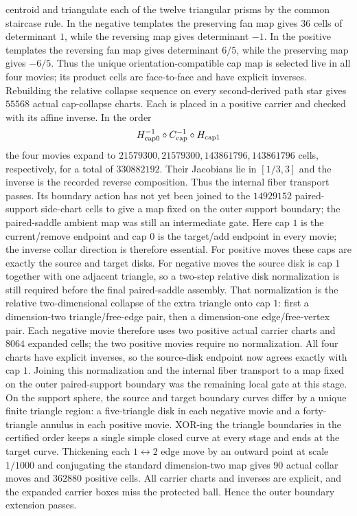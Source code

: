 centroid and triangulate each of the twelve triangular prisms by the common
staircase rule.  In the negative templates the preserving fan map gives $36$
cells of determinant $1$, while the reversing map gives determinant $-1$.  In
the positive templates the reversing fan map gives determinant $6/5$, while
the preserving map gives $-6/5$.  Thus the unique orientation-compatible cap
map is selected live in all four movies; its product cells are face-to-face and
have explicit inverses.  Rebuilding the relative collapse sequence on every
second-derived path star gives $55568$ actual cap-collapse charts.  Each is
placed in a positive carrier and checked with its affine inverse.  In the order
\begin{equation*}
H_{\rm cap0}^{-1}\circ C_{\rm cap}^{-1}\circ H_{\rm cap1}
\end{equation*}
the four movies expand to $21579300,21579300,143861796,143861796$ cells,
respectively, for a total of $330882192$.  Their Jacobians lie in $[1/3,3]$
and the inverse is the recorded reverse composition.  Thus the internal fiber
transport passes.  Its boundary action has not yet been joined to the
$14929152$ paired-support side-chart cells to give a map fixed on the outer
support boundary; the paired-saddle ambient map was still an intermediate gate.
Here cap $1$ is the current/remove endpoint and cap $0$ is the target/add
endpoint in every movie; the inverse collar direction is therefore essential.
For positive moves these caps are exactly the source and target disks.  For
negative moves the source disk is cap $1$ together with one adjacent triangle,
so a two-step relative disk normalization is still required before the final
paired-saddle assembly.
That normalization is the relative two-dimensional collapse of the extra
triangle onto cap $1$: first a dimension-two triangle/free-edge pair, then a
dimension-one edge/free-vertex pair.  Each negative movie therefore uses two
positive actual carrier charts and $8064$ expanded cells; the two positive
movies require no normalization.  All four charts have explicit inverses, so
the source-disk endpoint now agrees exactly with cap $1$.  Joining this
normalization and the internal fiber transport to a map fixed on the outer
paired-support boundary was the remaining local gate at this stage.
On the support sphere, the source and target boundary curves differ by a
unique finite triangle region: a five-triangle disk in each negative movie and
a forty-triangle annulus in each positive movie.  XOR-ing the triangle
boundaries in the certified order keeps a single simple closed curve at every
stage and ends at the target curve.  Thickening each $1\leftrightarrow2$
edge move by an outward point at scale $1/1000$ and conjugating the standard
dimension-two map gives $90$ actual collar moves and $362880$ positive cells.
All carrier charts and inverses are explicit, and the expanded carrier boxes
miss the protected ball.  Hence the outer boundary extension passes.

